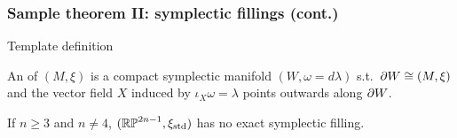 \begin{frame}
  \frametitle{Sample theorem II: symplectic fillings (cont.)}
  \begin{block}{Template definition}
  \end{block}
  \begin{definition}
    An  of $(M,\xi)$ is a compact symplectic manifold $(W,\omega=d\lambda)$ s.t.\ $\partial W\cong (M,\xi)$ and the vector field $X$ induced by $\iota_X \omega=\lambda$ points outwards along $\partial W$.
  \end{definition}

  \begin{theorem}[Zhou '20,'22]
    If $n\geq 3$ and $n\neq 4$, $(\mathbb{RP}^{2n-1}, \xi_{\text{std}})$ has no exact symplectic filling.
  \end{theorem}
\end{frame}

